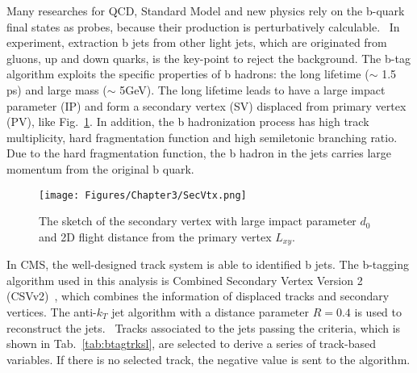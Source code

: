 Many researches for QCD, Standard Model and new physics rely on the b-quark final states as probes, because their production is perturbatively calculable.~\cite{hep-ph/0005110}
In experiment, extraction b jets from other light jets, which are originated from gluons, up and down quarks, is the key-point to reject the background.
The b-tag algorithm exploits the specific properties of b hadrons: the long lifetime ($\sim$ 1.5 ps) and large mass ($\sim$ 5GeV).
The long lifetime leads to have a large impact parameter (IP) and form a secondary vertex (SV) displaced from primary vertex (PV), like Fig.~\ref{fig:SecVtx}.
In addition, the b hadronization process has high track multiplicity, hard fragmentation function and high semiletonic branching ratio.
Due to the hard fragmentation function, the b hadron in the jets carries large momentum from the original b quark.

\begin{figure}[h]
  \centering
  \texttt{[image: Figures/Chapter3/SecVtx.png]}
  \caption{The sketch of the secondary vertex with large impact parameter $d_{0}$ and 2D flight distance from the primary vertex $L_{xy}$.}
  \label{fig:SecVtx}
\end{figure}

In CMS, the well-designed track system is able to identified b jets.
The b-tagging algorithm used in this analysis is Combined Secondary Vertex Version 2 (CSVv2)~\cite{CMS-PAS-BTV-15-001}, which combines the information of displaced tracks and secondary vertices.
The anti-$k_{T}$ jet algorithm with a distance parameter $R=0.4$ is used to reconstruct the jets.~\cite{1126-6708-2008-04-063}
Tracks associated to the jets passing the criteria, which is shown in Tab.~\ref{tab:btagtrksl}, are selected to derive a series of track-based variables.
If there is no selected track, the negative value is sent to the algorithm.

